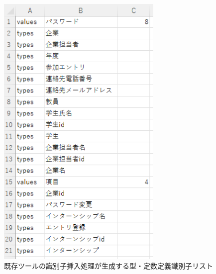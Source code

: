 \begin{figure}[tp]
    \begin{center}
        \includegraphics[width=300]{image/exis_katateisu_id_list.PNG}
        \caption{既存ツールの識別子挿入処理が生成する型・定数定義識別子リスト}
        \label{fig:exis_katateisu_id_list}
    \end{center}
\end{figure}


